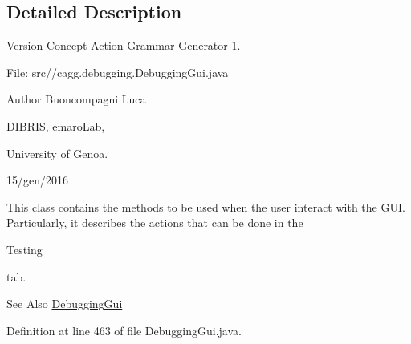 \subsection{Detailed Description}
\begin{DoxyVersion}{Version}
Concept-\/\-Action Grammar Generator 1. \par
 File\-: src//cagg.debugging.\-Debugging\-Gui.\-java \par

\end{DoxyVersion}
\begin{DoxyAuthor}{Author}
Buoncompagni Luca \par
 D\-I\-B\-R\-I\-S, emaro\-Lab,\par
 University of Genoa. \par
 15/gen/2016 \par

\end{DoxyAuthor}


This class contains the methods to be used when the user interact with the G\-U\-I. Particularly, it describes the actions that can be done in the
\begin{DoxyCode}
Testing 
\end{DoxyCode}
 tab. 

\begin{DoxySeeAlso}{See Also}
\hyperlink{classit_1_1emarolab_1_1cagg_1_1debugging_1_1DebuggingGui}{Debugging\-Gui} 
\end{DoxySeeAlso}


Definition at line 463 of file Debugging\-Gui.\-java.



